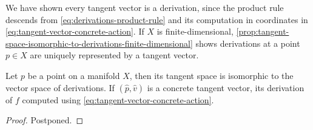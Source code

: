 \documentclass[../main-v2-manifolds.tex]{subfiles}
\begin{document}
%
%
We have shown every tangent vector is a derivation, since the product rule descends from \cref{eq:derivations-product-rule} and its computation in coordinates in \cref{eq:tangent-vector-concrete-action}.  If $X$ is finite-dimensional, \cref{prop:tangent-space-isomorphic-to-derivations-finite-dimensional} shows derivations at a point $p\in X$ are uniquely represented by a tangent vector.
%
%
\begin{wts}\label{prop:tangent-space-isomorphic-to-derivations-finite-dimensional}
Let $p$ be a point on a manifold $X$, then its tangent space is isomorphic to the vector space of derivations. If $(\hat{p},\hat{v})$ is a concrete tangent vector, its derivation of $f$ computed using \cref{eq:tangent-vector-concrete-action}.
\end{wts}
\begin{proof}
    Postponed.
\end{proof}


\end{document}
